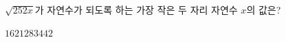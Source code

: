 $\sqrt{252x}$가 자연수가 되도록 하는 가장 작은 두 자리 자연수 $x$의 값은?
\begin{choices32}{$16$}{$21$}{$28$}{$34$}{$42$}\end{choices32}
